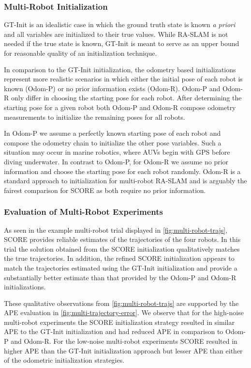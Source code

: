 \subsubsection{Multi-Robot Initialization}
\label{sec:multi-robot-init}

GT-Init is an idealistic case in which the ground truth state is known \textit{a
priori} and all variables are initialized to their true values. While RA-SLAM is
not needed if the true state is known, GT-Init is meant to serve as an upper
bound for reasonable quality of an initialization technique.

In comparison to the GT-Init initialization, the odometry based initializations
represent more realistic scenarios in which either the initial pose of each
robot is known (Odom-P) or no prior information exists (Odom-R). Odom-P and
Odom-R only differ in choosing the starting pose for each robot. After
determining the starting pose for a given robot both Odom-P and Odom-R compose
odometry measurements to initialize the remaining poses for all robots.

In Odom-P we assume a perfectly known starting pose of each robot and compose
the odometry chain to initialize the other pose variables. Such a situation may
occur in marine robotics, where AUVs begin with GPS before diving underwater.
In contrast to Odom-P, for Odom-R we assume no prior information and choose the
starting pose for each robot randomly. Odom-R is a standard
approach to initialization for multi-robot RA-SLAM \cite{guo2017ijmav,li20arxiv}
and is arguably the fairest comparison for SCORE as both require no prior
information.


\subsubsection{Evaluation of Multi-Robot Experiments}

As seen in the example multi-robot trial displayed in
\cref{fig:multi-robot-trajs}, SCORE provides reliable estimates of the
trajectories of the four robots. In this trial the solution obtained from the
SCORE initialization qualitatively matches the true trajectories. In addition,
the refined SCORE initialization appears to match the trajectories estimated
using the GT-Init initialization and provide a substantially better estimate
than that provided by the Odom-P and Odom-R initializations.

These qualitative observations from \cref{fig:multi-robot-trajs} are supported
by the APE evaluation in \cref{fig:multi-trajectory-error}. We
observe that for the high-noise multi-robot experiments the SCORE initialization
strategy resulted in similar APE to the GT-Init initialization and had
reduced APE in comparison to Odom-P and Odom-R. For the low-noise multi-robot
experiments SCORE resulted in higher APE than the GT-Init initialization
approach but lesser APE than either of the odometric initialization strategies.

